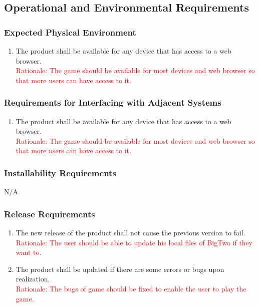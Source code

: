 \documentclass[12pt, titlepage]{article}
\begin{document}
\subsection{Operational and Environmental Requirements}

\subsubsection{Expected Physical Environment}
\begin{enumerate}
    \item The product shall be available for any device that has access to a web browser.\\
    \textcolor{red}{Rationale: The game should be available for most devices and web browser so that more users can have access to it.}
\end{enumerate}

\subsubsection{Requirements for Interfacing with Adjacent Systems}
\begin{enumerate}
    \item The product shall be available for any device that has access to a web browser. \\
    \textcolor{red}{Rationale: The game should be available for most devices and web browser so that more users can have access to it.}
\end{enumerate}

\subsubsection{Installability Requirements}
N/A

\subsubsection{Release Requirements}
\begin{enumerate}
    \item The new release of the product shall not cause the previous version to fail.\\
    \textcolor{red}{Rationale: The user should be able to update his local files of BigTwo if they want to.}
    \item The product shall be updated if there are some errors or bugs upon realization.\\
    \textcolor{red}{Rationale: The bugs of game should be fixed to enable the user to play the game.}
\end{enumerate}
\end{document}

